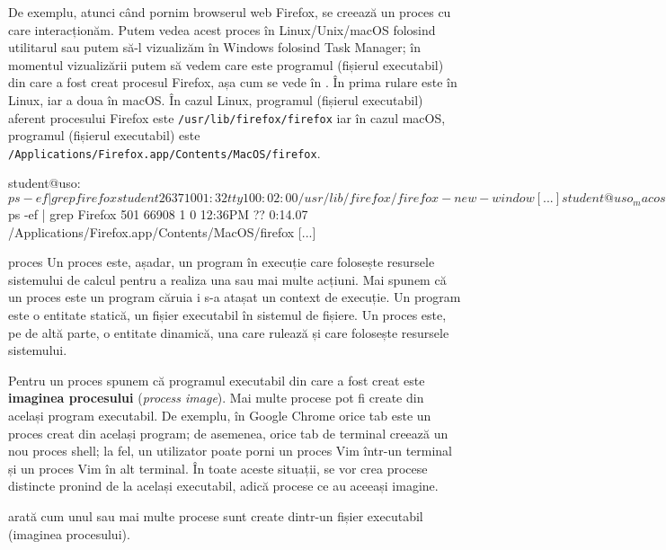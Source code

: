 De exemplu, atunci când pornim browserul web Firefox, se creează un proces cu care interacționăm.
Putem vedea acest proces în Linux/Unix/macOS folosind utilitarul  sau putem să-l vizualizăm în Windows folosind Task Manager;
în momentul vizualizării putem să vedem care este programul (fișierul executabil) din care a fost creat procesul Firefox, așa cum se vede în .
În  prima rulare este în Linux, iar a doua în macOS.
În cazul Linux, programul (fișierul executabil) aferent procesului Firefox este \texttt{/usr/lib/firefox/firefox} iar în cazul macOS, programul (fișierul executabil) este \texttt{/Applications/Firefox.app/Contents/MacOS/firefox}.

\begin{screen}[caption={Fișierul executabil al unui process},label={lst:process:exec-for-process}]
student@uso:~$ ps -ef | grep firefox
student   2637     1  0 01:32 tty1     00:02:00 /usr/lib/firefox/firefox -new-window
[...]
student@uso_macos:~$ ps -ef | grep Firefox
501 66908     1   0 12:36PM ??         0:14.07 /Applications/Firefox.app/Contents/MacOS/firefox
[...]
\end{screen}

\begin{definition}{proces}
  Un proces este, așadar, un program în execuție care folosește resursele sistemului de calcul pentru a realiza una sau mai multe acțiuni.
  Mai spunem că un proces este un program căruia i s-a atașat un context de execuție.
  Un program este o entitate statică, un fișier executabil în sistemul de fișiere.
  Un proces este, pe de altă parte, o entitate dinamică, una care rulează și care folosește resursele sistemului.
\end{definition}

Pentru un proces spunem că programul executabil din care a fost creat este \textbf{imaginea procesului} (\textit{process image}).
Mai multe procese pot fi create din același program executabil.
De exemplu, în Google Chrome orice tab este un proces creat din același program;
de asemenea, orice tab de terminal creează un nou proces shell;
la fel, un utilizator poate porni un proces Vim într-un terminal și un proces Vim în alt terminal.
În toate aceste situații, se vor crea procese distincte pronind de la același executabil, adică procese ce au aceeași imagine.

 arată cum unul sau mai multe procese sunt create dintr-un fișier executabil (imaginea procesului).

